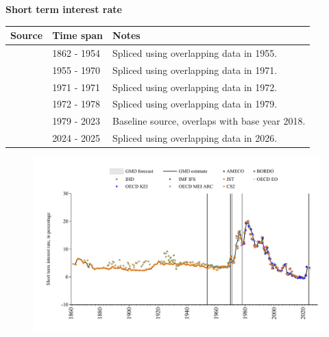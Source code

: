 \documentclass[12pt,a4paper,landscape]{article}
\begin{document}
\begin{adjustbox}{max totalsize={\paperwidth}{\paperheight},center}
\begin{minipage}[t][\textheight][t]{\textwidth}
\vspace*{0.5cm}
{}
\begin{center}
{\Large\bfseries Short term interest rate}
\end{center}
\vspace{0.5cm}
\begin{table}[H]
\centering
\small
\begin{tabular}{|l|l|l|}
\hline
\textbf{Source} & \textbf{Time span} & \textbf{Notes} \\
\hline
\rowcolor{white}\cite{CS2_ITA}& 1862 - 1954 &Spliced using overlapping data in 1955. \\
\rowcolor{lightgray}\cite{OECD_MEI_ARC}& 1955 - 1970 &Spliced using overlapping data in 1971. \\
\rowcolor{white}\cite{OECD_EO}& 1971 - 1971 &Spliced using overlapping data in 1972. \\
\rowcolor{lightgray}\cite{OECD_MEI_ARC}& 1972 - 1978 &Spliced using overlapping data in 1979. \\
\rowcolor{white}\cite{OECD_KEI}& 1979 - 2023 &Baseline source, overlaps with base year 2018. \\
\rowcolor{lightgray}\cite{OECD_EO}& 2024 - 2025 &Spliced using overlapping data in 2026. \\
\hline
\end{tabular}
\end{table}
\begin{figure}[H]
\centering
\includegraphics[width=\textwidth,height=0.6\textheight,keepaspectratio]{graphs/ITA_strate.pdf}
\end{figure}
\end{minipage}
\end{adjustbox}
\end{document}
